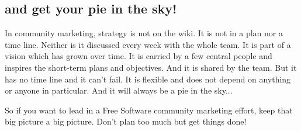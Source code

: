 \subsection*{and get your pie in the sky!}
In community marketing, strategy is not on the wiki. It is not in a plan nor a time line. Neither is it discussed every week with the whole team. It is part of a vision which has grown over time. It is carried by a few central people and inspires the short-term plans and objectives. And it is shared by the team. But it has no time line and it can't fail. It is flexible and does not depend on anything or anyone in particular. And it will always be a pie in the sky...

So if you want to lead in a Free Software community marketing effort, keep that big picture a big picture. Don’t plan too much but get things done!